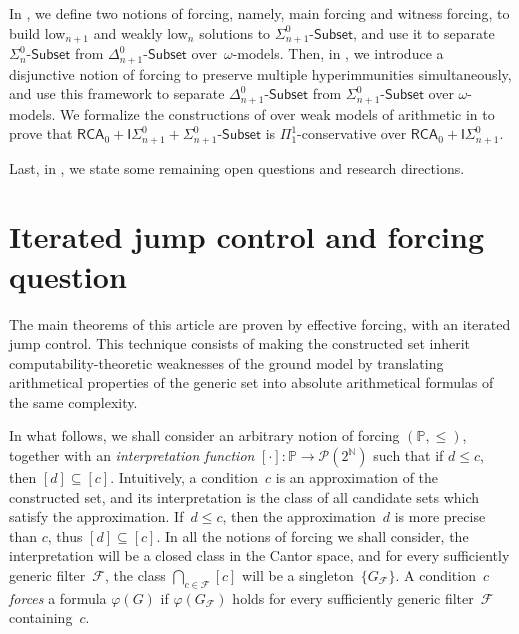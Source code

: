 \documentclass{article}
\def\NN{\mathbb{N}}
\def\PP{\mathbb{P}}
\def\F{\mathcal{F}}
\def\P{\mathcal{P}}
\def\PP{\mathbb{P}}
\newcommand{\cs}{2^{\NN}}
\newcommand{\ISig}{\mathsf{I}\Sigma^0}
\newcommand{\Sub}[1]{{#1}\mbox{-}\mathsf{Subset}}
\newcommand{\RCA}{\mathsf{RCA}}
\numberwithin{theorem}{section}
\theoremstyle{definition}
\begin{document}
In , we define two notions of forcing, namely, main forcing and witness forcing, to build low${}_{n+1}$ and weakly low${}_n$ solutions to $\Sub{\Sigma^0_{n+1}}$, and use it to separate $\Sub{\Sigma^0_n}$ from $\Sub{\Delta^0_{n+1}}$ over~$\omega$-models. Then, in , we introduce a disjunctive notion of forcing to preserve multiple hyperimmunities simultaneously, and use this framework to separate $\Sub{\Delta^0_{n+1}}$ from $\Sub{\Sigma^0_{n+1}}$ over $\omega$-models. We formalize the constructions of  over weak models of arithmetic in  to prove that $\RCA_0 + \ISig_{n+1} + \Sub{\Sigma^0_{n+1}}$ is $\Pi^1_1$-conservative over $\RCA_0 + \ISig_{n+1}$.

Last, in , we state some remaining open questions and research directions.

\section{Iterated jump control and forcing question}\label{sect:iterated-jump-control}

The main theorems of this article are proven by effective forcing, with an iterated jump control.
This technique consists of making the constructed set inherit computability-theoretic weaknesses of the ground model by translating arithmetical properties of the generic set into absolute arithmetical formulas of the same complexity.

In what follows, we shall consider an arbitrary notion of forcing $(\PP, \leq)$, together with an \emph{interpretation function} $[\cdot] : \PP \to \P(\cs)$ such that if $d \leq c$, then $[d] \subseteq [c]$.
Intuitively, a condition~$c$ is an approximation of the constructed set, and its interpretation is the class of all candidate sets which satisfy the approximation. If~$d \leq c$, then the approximation~$d$ is more precise than $c$, thus $[d] \subseteq [c]$. In all the notions of forcing we shall consider, the interpretation will be a closed class in the Cantor space, and for every sufficiently generic filter~$\F$, the class $\bigcap_{c \in \F} [c]$ will be a singleton~$\{G_\F\}$. A condition~$c$ \emph{forces} a formula $\varphi(G)$ if $\varphi(G_\F)$ holds for every sufficiently generic filter~$\F$ containing~$c$.
\end{document}
